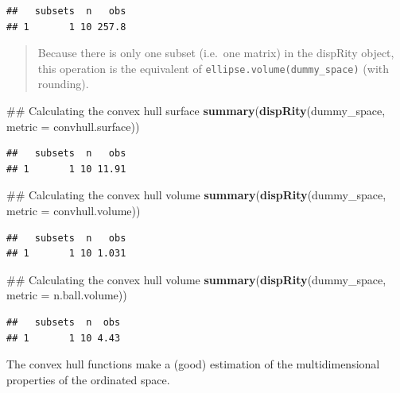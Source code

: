 \documentclass[]{book}
\newenvironment{Shaded}{\begin{snugshade}}{\end{snugshade}}
\newcommand{\KeywordTok}[1]{\textcolor[rgb]{0.13,0.29,0.53}{\textbf{#1}}}
\newcommand{\DataTypeTok}[1]{\textcolor[rgb]{0.13,0.29,0.53}{#1}}
\newcommand{\NormalTok}[1]{#1}
\theoremstyle{definition}
\theoremstyle{definition}
\theoremstyle{remark}
\begin{document}
\begin{verbatim}
##   subsets  n   obs
## 1       1 10 257.8
\end{verbatim}

\begin{quote}
Because there is only one subset (i.e.~one matrix) in the dispRity
object, this operation is the equivalent of
\texttt{ellipse.volume(dummy\_space)} (with rounding).
\end{quote}

\begin{Shaded}
\begin{Highlighting}[]
\NormalTok{## Calculating the convex hull surface}
\KeywordTok{summary}\NormalTok{(}\KeywordTok{dispRity}\NormalTok{(dummy_space, }\DataTypeTok{metric =}\NormalTok{ convhull.surface))}
\end{Highlighting}
\end{Shaded}

\begin{verbatim}
##   subsets  n   obs
## 1       1 10 11.91
\end{verbatim}

\begin{Shaded}
\begin{Highlighting}[]
\NormalTok{## Calculating the convex hull volume}
\KeywordTok{summary}\NormalTok{(}\KeywordTok{dispRity}\NormalTok{(dummy_space, }\DataTypeTok{metric =}\NormalTok{ convhull.volume))}
\end{Highlighting}
\end{Shaded}

\begin{verbatim}
##   subsets  n   obs
## 1       1 10 1.031
\end{verbatim}

\begin{Shaded}
\begin{Highlighting}[]
\NormalTok{## Calculating the convex hull volume}
\KeywordTok{summary}\NormalTok{(}\KeywordTok{dispRity}\NormalTok{(dummy_space, }\DataTypeTok{metric =}\NormalTok{ n.ball.volume))}
\end{Highlighting}
\end{Shaded}

\begin{verbatim}
##   subsets  n  obs
## 1       1 10 4.43
\end{verbatim}

The convex hull functions make a (good) estimation of the
multidimensional properties of the ordinated space.
\end{document}
